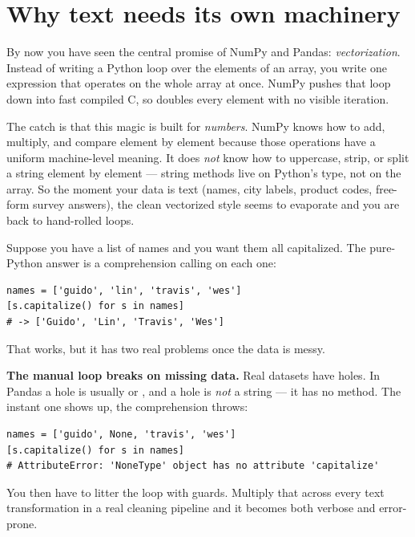 \documentclass[11pt]{article}
\begin{document}

\section{Why text needs its own machinery}

\begin{background}
By now you have seen the central promise of NumPy and Pandas: \emph{vectorization}. Instead of writing a Python  loop over the elements of an array, you write one expression that operates on the whole array at once. NumPy pushes that loop down into fast compiled C, so  doubles every element with no visible iteration.

The catch is that this magic is built for \emph{numbers}. NumPy knows how to add, multiply, and compare element by element because those operations have a uniform machine-level meaning. It does \emph{not} know how to uppercase, strip, or split a string element by element --- string methods live on Python's  type, not on the array. So the moment your data is text (names, city labels, product codes, free-form survey answers), the clean vectorized style seems to evaporate and you are back to hand-rolled loops.
\end{background}

Suppose you have a list of names and you want them all capitalized. The pure-Python answer is a comprehension calling  on each one:

\begin{lstlisting}
names = ['guido', 'lin', 'travis', 'wes']
[s.capitalize() for s in names]
# -> ['Guido', 'Lin', 'Travis', 'Wes']
\end{lstlisting}

That works, but it has two real problems once the data is messy.

\begin{pitfall}
\textbf{The manual loop breaks on missing data.} Real datasets have holes. In Pandas a hole is usually  or , and a hole is \emph{not} a string --- it has no  method. The instant one shows up, the comprehension throws:
\begin{lstlisting}
names = ['guido', None, 'travis', 'wes']
[s.capitalize() for s in names]
# AttributeError: 'NoneType' object has no attribute 'capitalize'
\end{lstlisting}
You then have to litter the loop with  guards. Multiply that across every text transformation in a real cleaning pipeline and it becomes both verbose and error-prone.
\end{pitfall}
\end{document}
